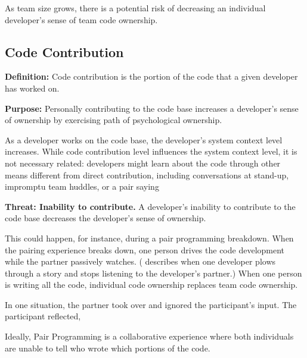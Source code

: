 As team size grows, there is a potential risk of decreasing an individual developer's sense of team code ownership. 

\subsection{Code Contribution}
\textbf{Definition:} Code contribution is the portion of the code that a given developer has worked on. 

\textbf{Purpose:} Personally contributing to the code base increases a developer's sense of ownership by exercising  path of psychological ownership. 

As a developer works on the code base, the developer's system context level increases. While code contribution level influences the system context level, it is not necessary related: developers might learn about the code through other means different from direct contribution, including conversations at stand-up, impromptu team huddles, or a pair saying 

\textbf{Threat: Inability to contribute.}  A developer's inability to contribute to the code base decreases the developer's sense of ownership. 

This could happen, for instance, during a pair programming breakdown. When the pairing experience breaks down, one person drives the code development while the partner passively watches. ( describes when one developer plows through a story and stops listening to the developer's partner.)  When one person is writing all the code, individual code ownership replaces team code ownership.  

In one situation, the partner took over and ignored the participant's input. The participant reflected,  



Ideally, Pair Programming is a collaborative experience where both individuals are unable to tell who wrote which portions of the code. 

